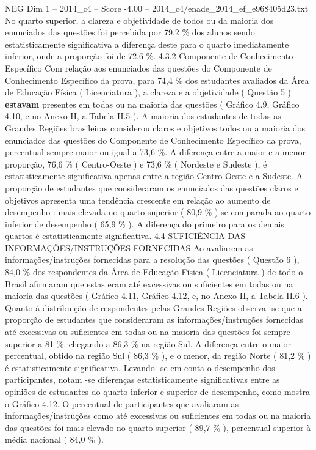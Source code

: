 \begin{textsample}{NEG Dim 1 – 2014\_c4 – Score -4.00 – 2014\_c4/enade\_2014\_ef\_e968405d23.txt}
No quarto superior, a clareza e objetividade de todos ou da maioria dos enunciados das questões foi percebida por 79,2 \% dos alunos sendo estatisticamente significativa a diferença deste para o quarto imediatamente inferior, onde a proporção foi de 72,6 \%. 4.3.2 Componente de Conhecimento Específico Com relação aos enunciados das questões do Componente de Conhecimento Específico da prova, para 74,4 \% dos estudantes avaliados da Área de Educação Física ( Licenciatura ), a clareza e a objetividade ( Questão 5 ) \textbf{estavam} presentes em todas ou na maioria das questões ( Gráfico 4.9, Gráfico 4.10, e no Anexo II, a Tabela II.5 ).
A maioria dos estudantes de todas as Grandes Regiões brasileiras considerou claros e objetivos todos ou a maioria dos enunciados das questões do Componente de Conhecimento Específico da prova, percentual sempre maior ou igual a 73,6 \%.
A diferença entre a maior e a menor proporção, 76,6 \% ( Centro-Oeste ) e 73,6 \% ( Nordeste e Sudeste ), é estatisticamente significativa apenas entre a região Centro-Oeste e a Sudeste.
A proporção de estudantes que consideraram os enunciados das questões claros e objetivos apresenta uma tendência crescente em relação ao aumento de desempenho : mais elevada no quarto superior ( 80,9 \% ) se comparada ao quarto inferior de desempenho ( 65,9 \% ).
A diferença do primeiro para os demais quartos é estatisticamente significativa. 4.4 SUFICIÊNCIA DAS INFORMAÇÕES/INSTRUÇÕES FORNECIDAS Ao avaliarem as informações/instruções fornecidas para a resolução das questões ( Questão 6 ), 84,0 \% dos respondentes da Área de Educação Física ( Licenciatura ) de todo o Brasil afirmaram que estas eram até excessivas ou suficientes em todas ou na maioria das questões ( Gráfico 4.11, Gráfico 4.12, e, no Anexo II, a Tabela II.6 ).
Quanto à distribuição de respondentes pelas Grandes Regiões observa -se que a proporção de estudantes que consideraram as informações/instruções fornecidas até excessivas ou suficientes em todas ou na maioria das questões foi sempre superior a 81 \%, chegando a 86,3 \% na região Sul.
A diferença entre o maior percentual, obtido na região Sul ( 86,3 \% ), e o menor, da região Norte ( 81,2 \% ) é estatisticamente significativa.
Levando -se em conta o desempenho dos participantes, notam -se diferenças estatisticamente significativas entre as opiniões de estudantes do quarto inferior e superior de desempenho, como mostra o Gráfico 4.12.
O percentual de participantes que avaliaram as informações/instruções como até excessivas ou suficientes em todas ou na maioria das questões foi mais elevado no quarto superior ( 89,7 \% ), percentual superior à média nacional ( 84,0 \% ).

\end{textsample}
